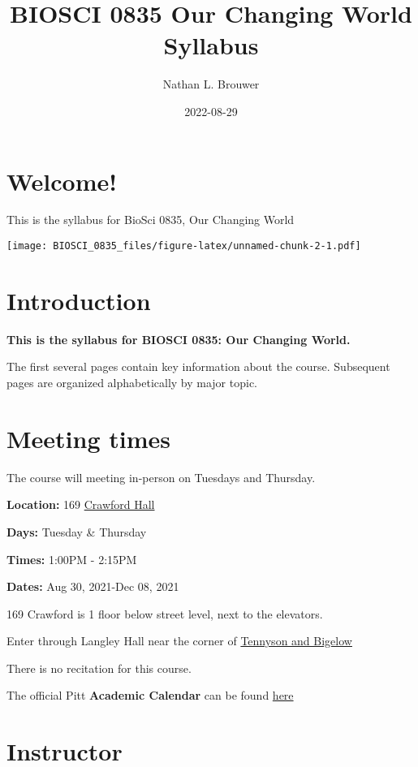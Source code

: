 \documentclass[
]{book}
\title{BIOSCI 0835 Our Changing World Syllabus}
\author{Nathan L. Brouwer}
\date{2022-08-29}
\begin{document}
\maketitle

{
\setcounter{tocdepth}{1}
\tableofcontents
}
\hypertarget{welcome}{%
\chapter{Welcome!}\label{welcome}}

This is the syllabus for BioSci 0835, Our Changing World

\texttt{[image: BIOSCI\_0835\_files/figure-latex/unnamed-chunk-2-1.pdf]}

\hypertarget{intro}{%
\chapter{Introduction}\label{intro}}

\textbf{This is the syllabus for BIOSCI 0835: Our Changing World.}

The first several pages contain key information about the course. Subsequent pages are organized alphabetically by major topic.

\hypertarget{meeting-times}{%
\chapter{Meeting times}\label{meeting-times}}

The course will meeting in-person on Tuesdays and Thursday.

\textbf{Location:} 169 \href{https://calendar.pitt.edu/crawford_hall_909\#.YSZMWdPYq3I}{Crawford Hall}

\textbf{Days:} Tuesday \& Thursday

\textbf{Times:} 1:00PM - 2:15PM

\textbf{Dates:} Aug 30, 2021-Dec 08, 2021

169 Crawford is 1 floor below street level, next to the elevators.

Enter through Langley Hall near the corner of \href{https://goo.gl/maps/ay3KxznH1u4VisWo8}{Tennyson and Bigelow}

There is no recitation for this course.

The official Pitt \textbf{Academic Calendar} can be found \href{https://www.registrar.pitt.edu/sites/default/files/pdf/Academic\%20Calendar\%202022-2023_Apple.pdf}{here}

\hypertarget{nlb}{%
\chapter{Instructor}\label{nlb}}
\end{document}
